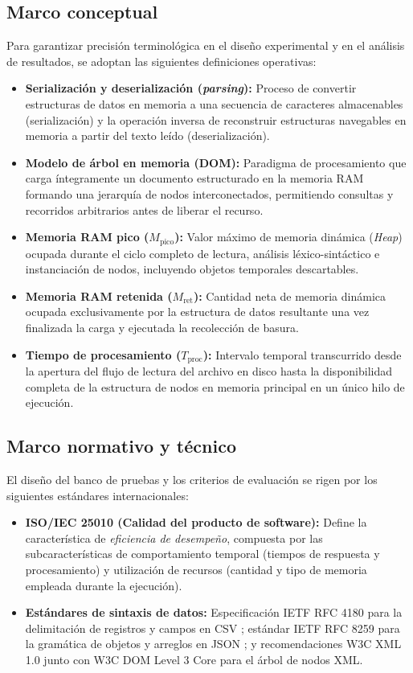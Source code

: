 \subsection{Marco conceptual}

Para garantizar precisión terminológica en el diseño experimental y en el análisis de resultados, se adoptan las siguientes definiciones operativas:

\begin{itemize}
    \item \textbf{Serialización y deserialización (\textit{parsing}):} Proceso de convertir estructuras de datos en memoria a una secuencia de caracteres almacenables (serialización) y la operación inversa de reconstruir estructuras navegables en memoria a partir del texto leído (deserialización).
    \item \textbf{Modelo de árbol en memoria (DOM):} Paradigma de procesamiento que carga íntegramente un documento estructurado en la memoria RAM formando una jerarquía de nodos interconectados, permitiendo consultas y recorridos arbitrarios antes de liberar el recurso.
    \item \textbf{Memoria RAM pico ($M_{\text{pico}}$):} Valor máximo de memoria dinámica (\textit{Heap}) ocupada durante el ciclo completo de lectura, análisis léxico-sintáctico e instanciación de nodos, incluyendo objetos temporales descartables.
    \item \textbf{Memoria RAM retenida ($M_{\text{ret}}$):} Cantidad neta de memoria dinámica ocupada exclusivamente por la estructura de datos resultante una vez finalizada la carga y ejecutada la recolección de basura.
    \item \textbf{Tiempo de procesamiento ($T_{\text{proc}}$):} Intervalo temporal transcurrido desde la apertura del flujo de lectura del archivo en disco hasta la disponibilidad completa de la estructura de nodos en memoria principal en un único hilo de ejecución.
\end{itemize}

\subsection{Marco normativo y técnico}

El diseño del banco de pruebas y los criterios de evaluación se rigen por los siguientes estándares internacionales:

\begin{itemize}
    \item \textbf{ISO/IEC 25010 (Calidad del producto de software):} Define la característica de \textit{eficiencia de desempeño}, compuesta por las subcaracterísticas de comportamiento temporal (tiempos de respuesta y procesamiento) y utilización de recursos (cantidad y tipo de memoria empleada durante la ejecución).
    \item \textbf{Estándares de sintaxis de datos:} Especificación IETF RFC 4180 para la delimitación de registros y campos en CSV \cite{shafranovich2005}; estándar IETF RFC 8259 para la gramática de objetos y arreglos en JSON \cite{bray2017}; y recomendaciones W3C XML 1.0 \cite{bray1998} junto con W3C DOM Level 3 Core \cite{w3cdom2004} para el árbol de nodos XML.
\end{itemize}

